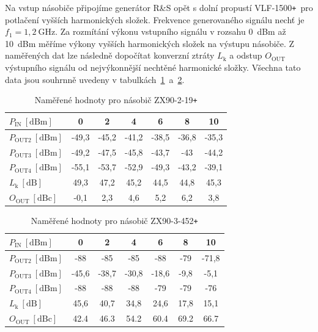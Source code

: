 \documentclass[11pt,a4paper]{article}
\newcommand{\plus}{{\texttt{+}}}
\begin{document}
Na vstup násobiče připojíme generátor R\&S opět s dolní propustí VLF-1500\plus~pro potlačení vyšších harmonických složek. Frekvence generovaného signálu nechť je $f_1 = 1,2 \ \mathrm{GHz}$. Za rozmítání výkonu vstupního signálu v rozsahu 0~dBm až 10~dBm měříme výkony vyšších harmonických složek na výstupu násobiče. Z naměřených dat lze následně dopočítat konverzní ztráty $L_{\mathrm k}$ a odstup $O_{\mathrm{OUT}}$ výstupního signálu od nejvýkonnější nechtěné harmonické složky. Všechna tato data jsou souhrnně uvedeny v tabulkách~\ref{table:task4-data_ZX90-2-19+}~a~\ref{table:task4-data_ZX90-3-452+}.
\begin{table}[!ht]
    \centering
    \begin{tabular}{| l || c | c | c | c | c | c |}
        \hline
        $P_{\mathrm{IN}} \ [\mathrm{dBm}]$ & 0 & 2 & 4 & 6 & 8 & 10\\
        \hline\hline
        $P_{\mathrm{OUT2}} \ [\mathrm{dBm}]$ & -49,3 & -45,2 & -41,2 & -38,5 & -36,8 & -35,3\\
        \hline
        $P_{\mathrm{OUT3}} \ [\mathrm{dBm}]$ & -49,2 & -47,5 & -45,8 & -43,7 & -43 & -44,2\\
        \hline
        $P_{\mathrm{OUT4}} \ [\mathrm{dBm}]$ & -55,1 & -53,7 & -52,9 & -49,3 & -43,2 & -39,1\\
        \hline\hline
        $L_{\mathrm{k}} \ [\mathrm{dB}]$ & 49,3 & 47,2 & 45,2 & 44,5 & 44,8 & 45,3\\
        \hline
        $O_{\mathrm{OUT}} \ [\mathrm{dBc}]$ & -0,1 & 2,3 & 4,6 & 5,2 & 6,2 & 3,8\\
        \hline
    \end{tabular}
    \caption{Naměřené hodnoty pro násobič ZX90-2-19\plus}
    \label{table:task4-data_ZX90-2-19+}
\end{table}
\begin{table}[!ht]
    \centering
    \begin{tabular}{| l || c | c | c | c | c | c |}
        \hline
        $P_{\mathrm{IN}} \ [\mathrm{dBm}]$ & 0 & 2 & 4 & 6 & 8 & 10\\
        \hline\hline
        $P_{\mathrm{OUT2}} \ [\mathrm{dBm}]$ & -88 & -85 & -85 & -88 & -79 & -71,8\\
        \hline
        $P_{\mathrm{OUT3}} \ [\mathrm{dBm}]$ & -45,6 & -38,7 & -30,8 & -18,6 & -9,8 & -5,1\\
        \hline
        $P_{\mathrm{OUT4}} \ [\mathrm{dBm}]$ & -88 & -88 & -88 & -79 & -79 & -76\\
        \hline\hline
        $L_{\mathrm{k}} \ [\mathrm{dB}]$ & 45,6 & 40,7 & 34,8 & 24,6 & 17,8 & 15,1\\
        \hline
        $O_{\mathrm{OUT}} \ [\mathrm{dBc}]$ & 42.4 & 46.3 & 54.2 & 60.4 & 69.2 & 66.7\\
        \hline
    \end{tabular}
    \caption{Naměřené hodnoty pro násobič ZX90-3-452\plus}
    \label{table:task4-data_ZX90-3-452+}
\end{table}
\end{document}

